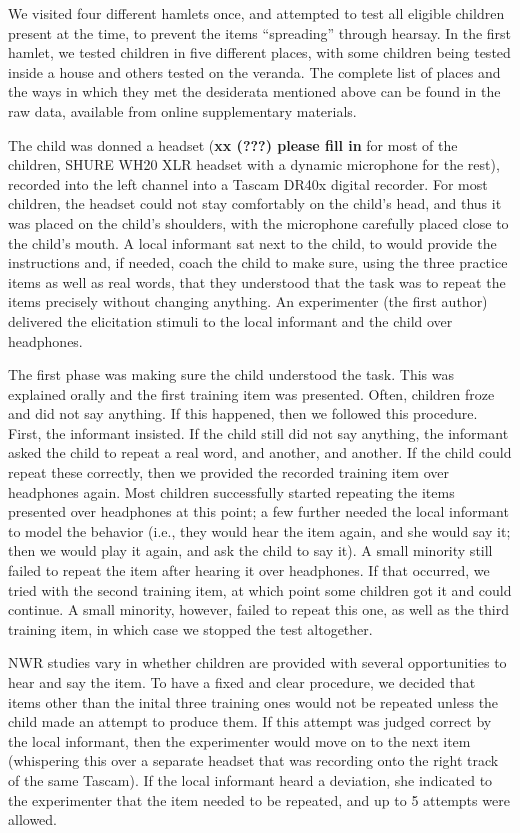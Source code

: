\documentclass[english,,man]{apa6}
\begin{document}
We visited four different hamlets once, and attempted to test all eligible children present at the time, to prevent the items \enquote{spreading} through hearsay. In the first hamlet, we tested children in five different places, with some children being tested inside a house and others tested on the veranda. The complete list of places and the ways in which they met the desiderata mentioned above can be found in the raw data, available from online supplementary materials.

The child was donned a headset (\textbf{xx ({\textbf{???}}) please fill in} for most of the children, SHURE WH20 XLR headset with a dynamic microphone for the rest), recorded into the left channel into a Tascam DR40x digital recorder. For most children, the headset could not stay comfortably on the child's head, and thus it was placed on the child's shoulders, with the microphone carefully placed close to the child's mouth. A local informant sat next to the child, to would provide the instructions and, if needed, coach the child to make sure, using the three practice items as well as real words, that they understood that the task was to repeat the items precisely without changing anything. An experimenter (the first author) delivered the elicitation stimuli to the local informant and the child over headphones.

The first phase was making sure the child understood the task. This was explained orally and the first training item was presented. Often, children froze and did not say anything. If this happened, then we followed this procedure. First, the informant insisted. If the child still did not say anything, the informant asked the child to repeat a real word, and another, and another. If the child could repeat these correctly, then we provided the recorded training item over headphones again. Most children successfully started repeating the items presented over headphones at this point; a few further needed the local informant to model the behavior (i.e., they would hear the item again, and she would say it; then we would play it again, and ask the child to say it). A small minority still failed to repeat the item after hearing it over headphones. If that occurred, we tried with the second training item, at which point some children got it and could continue. A small minority, however, failed to repeat this one, as well as the third training item, in which case we stopped the test altogether.

NWR studies vary in whether children are provided with several opportunities to hear and say the item. To have a fixed and clear procedure, we decided that items other than the inital three training ones would not be repeated unless the child made an attempt to produce them. If this attempt was judged correct by the local informant, then the experimenter would move on to the next item (whispering this over a separate headset that was recording onto the right track of the same Tascam). If the local informant heard a deviation, she indicated to the experimenter that the item needed to be repeated, and up to 5 attempts were allowed.
\end{document}
